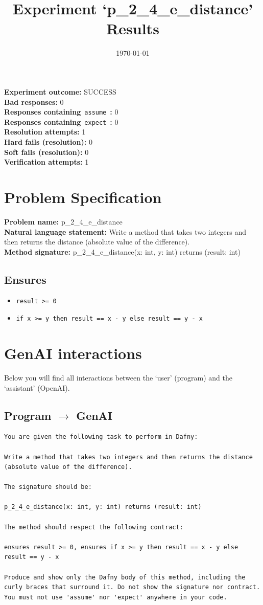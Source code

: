 \documentclass{article}
\begin{document}
\title{Experiment `p\_2\_4\_e\_distance' Results}
\author{\today}
\date{}
\maketitle
\textbf{Experiment outcome: }SUCCESS
\\\textbf{Bad responses: }0
\\\textbf{Responses containing}~\texttt{assume}~\textbf{: }0
\\\textbf{Responses containing}~\texttt{expect}~\textbf{: }0
\\\textbf{Resolution attempts: }1
\\\textbf{Hard fails (resolution): }0
\\\textbf{Soft fails (resolution): }0
\\\textbf{Verification attempts: }1
\section*{Problem Specification}
\textbf{Problem name: }p\_2\_4\_e\_distance
\\\textbf{Natural language statement: }Write a method that takes two integers and then returns the distance (absolute value of the difference).
\\\textbf{Method signature: }p\_2\_4\_e\_distance(x: int, y: int) returns (result: int)
\subsection*{Ensures}
\begin{itemize}
\item \texttt{result >= 0}
\item \texttt{if x >= y then result == x - y else result == y - x}
\end{itemize}
\clearpage
\section*{GenAI interactions}
Below you will find all interactions between the `user' (program) and the `assistant' (OpenAI).
\subsection*{Program $\rightarrow$ GenAI}
\begin{lstlisting}
You are given the following task to perform in Dafny:

Write a method that takes two integers and then returns the distance (absolute value of the difference).

The signature should be:

p_2_4_e_distance(x: int, y: int) returns (result: int)

The method should respect the following contract:

ensures result >= 0, ensures if x >= y then result == x - y else result == y - x

Produce and show only the Dafny body of this method, including the curly braces that surround it. Do not show the signature nor contract. You must not use 'assume' nor 'expect' anywhere in your code.
\end{lstlisting}
\end{document}
